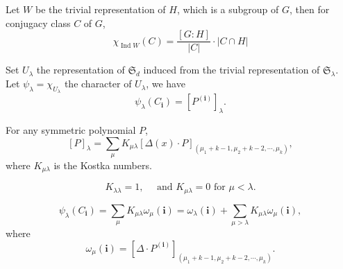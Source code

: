 \documentclass[11pt]{homework}
\begin{document}

\begin{lemma}
    \label{lma:induced_trivial}
    Let $W$ be the trivial representation of $H$, which is a subgroup of $G$, then for conjugacy class $C$ of $G$, 
    \begin{equation*}
        \chi_{\operatorname{Ind} W}(C) = \frac{[G:H]}{|C|} \cdot |C\cap H|
    \end{equation*}
\end{lemma}

\begin{proposition}
    \label{prop:psi}
    Set $U_\lambda$ the representation of $\mathfrak{S}_d$ induced from the trivial representation of $\mathfrak{S}_\lambda$.
    Let $\psi_{\lambda} = \chi_{U_\lambda}$  the character of $U_\lambda$, we have
    \begin{equation*}
        \psi_{\lambda}(C_\mathbf{i}) = \left[P^{(\mathbf{i})}\right]_\lambda.
    \end{equation*}
\end{proposition}

\begin{lemma}
    \label{lma:sym_poly}
    For any symmetric polynomial $P$,
    \begin{equation*}
        \left[P\right]_\lambda = \sum_{\mu} K_{\mu \lambda} \left[\Delta(x) \cdot P \right]_{(\mu_1 + k - 1, \mu_2 + k - 2, \cdots , \mu_k)},
    \end{equation*}
    where $K_{\mu\lambda}$ is the Kostka numbers.
\end{lemma}

\begin{lemma}
    \label{lma:kostka}
    \begin{equation*}
        K_{\lambda \lambda} = 1 , \quad \text{ and } K_{\mu \lambda} = 0 \text{ for } \mu < \lambda.
    \end{equation*}
\end{lemma}

\begin{proposition}
    \label{prop:psi_omega}
    \begin{equation*}
        \psi_{\lambda}(C_\mathbf{i}) = \sum_{\mu} K_{\mu\lambda} \omega_\mu(\mathbf{i}) = \omega_\lambda(\mathbf{i}) + \sum_{\mu > \lambda} K_{\mu\lambda} \omega_\mu(\mathbf{i}) ,
    \end{equation*}
    where
    \begin{equation*}
        \omega_\mu(\mathbf{i}) = \left[\Delta \cdot P^{(\mathbf{i})}\right]_{(\mu_1 + k - 1, \mu_2 + k - 2, \cdots , \mu_k)}.
    \end{equation*}
\end{proposition}
\end{document}
